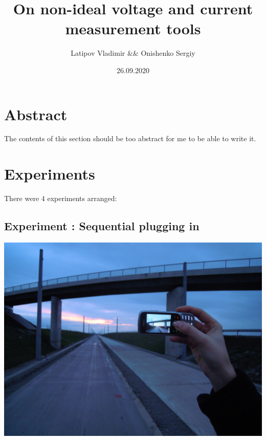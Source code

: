 \documentclass[12pt]{article}
\title{On non-ideal voltage and current measurement tools}
\date{26.09.2020}
\author{Latipov Vladimir \&\& Onishenko Sergiy}
\begin{document}

    \doublespacing
    \doublespacing

    \maketitle
    \newpage

    \tableofcontents

    \newpage

    \section{Abstract}\label{sec:abstract}
    The contents of this section should be too abstract for me to be able to write it.

    \section{Experiments}\label{sec:experiments}
    There were 4 experiments arranged:

        \subsection{Experiment : Sequential plugging in}\label{subsec:experiment-1} %
    \includegraphics[width=\linewidth]{images/schemes/scheme0.png}
\end{document}
